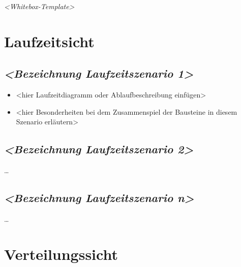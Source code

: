 \documentclass[
]{article}
\begin{document}
\emph{\textless Whitebox-Template\textgreater{}}

\hypertarget{section-runtime-view}{%
  \section{Laufzeitsicht}\label{section-runtime-view}}

\hypertarget{__emphasis_bezeichnung_laufzeitszenario_1_emphasis}{%
  \subsection{\texorpdfstring{\emph{\textless Bezeichnung Laufzeitszenario
        1\textgreater{}}}{\textless Bezeichnung Laufzeitszenario 1\textgreater{}}}\label{__emphasis_bezeichnung_laufzeitszenario_1_emphasis}}

\begin{itemize}
  \item
        \textless hier Laufzeitdiagramm oder Ablaufbeschreibung
        einfügen\textgreater{}
  \item
        \textless hier Besonderheiten bei dem Zusammenspiel der Bausteine in
        diesem Szenario erläutern\textgreater{}
\end{itemize}

\hypertarget{__emphasis_bezeichnung_laufzeitszenario_2_emphasis}{%
  \subsection{\texorpdfstring{\emph{\textless Bezeichnung Laufzeitszenario
        2\textgreater{}}}{\textless Bezeichnung Laufzeitszenario 2\textgreater{}}}\label{__emphasis_bezeichnung_laufzeitszenario_2_emphasis}}

\ldots{}

\hypertarget{__emphasis_bezeichnung_laufzeitszenario_n_emphasis}{%
  \subsection{\texorpdfstring{\emph{\textless Bezeichnung Laufzeitszenario
        n\textgreater{}}}{\textless Bezeichnung Laufzeitszenario n\textgreater{}}}\label{__emphasis_bezeichnung_laufzeitszenario_n_emphasis}}

\ldots{}

\hypertarget{section-deployment-view}{%
  \section{Verteilungssicht}\label{section-deployment-view}}
\end{document}
